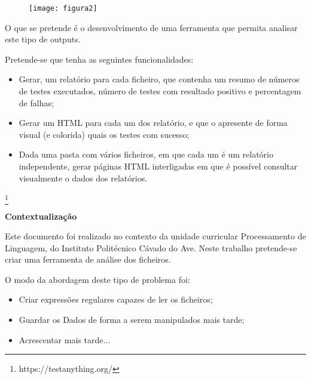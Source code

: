 \documentclass{article}
\begin{document}
\begin{figure}[!htb]
	\centering
	\texttt{[image: figura2]}
\end{figure}
\vspace*{2 em}
O que se pretende é o desenvolvimento de uma ferramenta que permita analisar este tipo de outputs.
\vspace*{2 em}

Pretende-se que tenha as seguintes funcionalidades:

\vspace*{1 em}

\begin{itemize}
\item Gerar, um relatório para cada ficheiro, que contenha um resumo de números de testes executados, número de testes com resultado positivo e percentagem de falhas;
\item Gerar um HTML para cada um dos relatório, e que o apresente de forma visual (e colorida) quais os testes com sucesso;
\item Dada uma pasta com vários ficheiros, em que cada um é um relatório independente, gerar páginas
HTML interligadas em que é possível consultar visualmente o dados dos relatórios.
\end{itemize}

\footnote[1]{https://testanything.org/}

\newpage


\centerline{\textbf{Contextualização}}
\vspace{3 em}
Este documento foi realizado no contexto da unidade curricular Processamento de Linguagem, do Instituto Politécnico Cávado do Ave.
Neste trabalho pretende-se criar uma ferramenta de análise dos ficheiros.

\vspace{3 em}
O modo da abordagem deste tipo de problema foi: 
\vspace{1 em}
\begin{itemize}
	\item Criar expressões regulares capazes de ler os ficheiros;
	\item Guardar os Dados de forma a serem manipulados mais tarde;
	\item Acrescentar mais tarde...
\end{itemize}

\newpage
\end{document}
